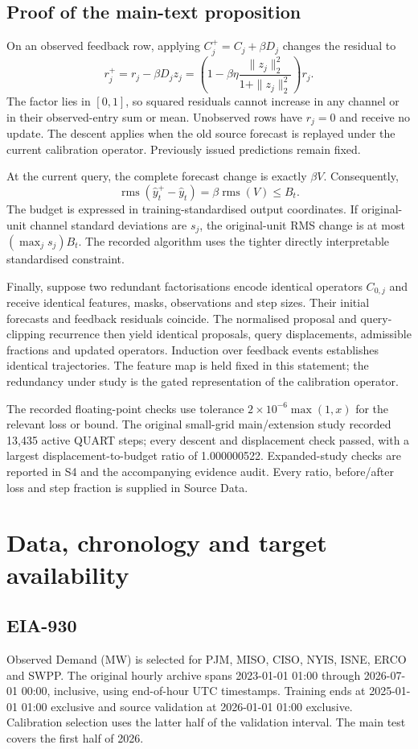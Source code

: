 \documentclass[11pt,a4paper]{article}
\newcommand{\rms}{\operatorname{rms}}
\begin{document}
\subsection{Proof of the main-text proposition}
On an observed feedback row, applying $C_j^+=C_j+\beta D_j$ changes the residual to
\[
r_j^+=r_j-\beta D_jz_j
      =\left(1-\beta\eta\frac{\|z_j\|_2^2}{1+\|z_j\|_2^2}\right)r_j.
\]
The factor lies in $[0,1]$, so squared residuals cannot increase in any channel or in their observed-entry sum or mean. Unobserved rows have $r_j=0$ and receive no update. The descent applies when the old source forecast is replayed under the current calibration operator. Previously issued predictions remain fixed.

At the current query, the complete forecast change is exactly $\beta V$. Consequently,
\[
\rms(\widehat y_t^+-\widehat y_t)=\beta\rms(V)\leq B_t.
\]
The budget is expressed in training-standardised output coordinates. If original-unit channel standard deviations are $s_j$, the original-unit RMS change is at most $(\max_j s_j)B_t$. The recorded algorithm uses the tighter directly interpretable standardised constraint.

Finally, suppose two redundant factorisations encode identical operators $C_{0,j}$ and receive identical features, masks, observations and step sizes. Their initial forecasts and feedback residuals coincide. The normalised proposal and query-clipping recurrence then yield identical proposals, query displacements, admissible fractions and updated operators. Induction over feedback events establishes identical trajectories. The feature map is held fixed in this statement; the redundancy under study is the gated representation of the calibration operator.

The recorded floating-point checks use tolerance $2\times10^{-6}\max(1,x)$ for the relevant loss or bound. The original small-grid main/extension study recorded 13,435 active QUART steps; every descent and displacement check passed, with a largest displacement-to-budget ratio of 1.000000522. Expanded-study checks are reported in S4 and the accompanying evidence audit. Every ratio, before/after loss and step fraction is supplied in Source Data.

\section{Data, chronology and target availability}
\subsection{EIA-930}
Observed Demand (MW) is selected for PJM, MISO, CISO, NYIS, ISNE, ERCO and SWPP. The original hourly archive spans 2023-01-01 01:00 through 2026-07-01 00:00, inclusive, using end-of-hour UTC timestamps. Training ends at 2025-01-01 01:00 exclusive and source validation at 2026-01-01 01:00 exclusive. Calibration selection uses the latter half of the validation interval. The main test covers the first half of 2026.
\end{document}
